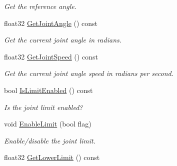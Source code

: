 \begin{DoxyCompactItemize}
\begin{DoxyCompactList}\small\item\em Get the reference angle. \end{DoxyCompactList}\item 
float32 \hyperlink{classb2_revolute_joint_ab20fc12ce5ad5d84a032eb613c80764a}{Get\+Joint\+Angle} () const \hypertarget{classb2_revolute_joint_ab20fc12ce5ad5d84a032eb613c80764a}{}\label{classb2_revolute_joint_ab20fc12ce5ad5d84a032eb613c80764a}

\begin{DoxyCompactList}\small\item\em Get the current joint angle in radians. \end{DoxyCompactList}\item 
float32 \hyperlink{classb2_revolute_joint_a48e4db13c187af159587d731656aa0c4}{Get\+Joint\+Speed} () const \hypertarget{classb2_revolute_joint_a48e4db13c187af159587d731656aa0c4}{}\label{classb2_revolute_joint_a48e4db13c187af159587d731656aa0c4}

\begin{DoxyCompactList}\small\item\em Get the current joint angle speed in radians per second. \end{DoxyCompactList}\item 
bool \hyperlink{classb2_revolute_joint_a7711afbfbdba4451d2dbfa8e55b9ded8}{Is\+Limit\+Enabled} () const \hypertarget{classb2_revolute_joint_a7711afbfbdba4451d2dbfa8e55b9ded8}{}\label{classb2_revolute_joint_a7711afbfbdba4451d2dbfa8e55b9ded8}

\begin{DoxyCompactList}\small\item\em Is the joint limit enabled? \end{DoxyCompactList}\item 
void \hyperlink{classb2_revolute_joint_a56bdfdd04e906e52d0258f6a481b9093}{Enable\+Limit} (bool flag)\hypertarget{classb2_revolute_joint_a56bdfdd04e906e52d0258f6a481b9093}{}\label{classb2_revolute_joint_a56bdfdd04e906e52d0258f6a481b9093}

\begin{DoxyCompactList}\small\item\em Enable/disable the joint limit. \end{DoxyCompactList}\item 
float32 \hyperlink{classb2_revolute_joint_a0f33656869e46ec9405f42d68e858220}{Get\+Lower\+Limit} () const \hypertarget{classb2_revolute_joint_a0f33656869e46ec9405f42d68e858220}{}\label{classb2_revolute_joint_a0f33656869e46ec9405f42d68e858220}


\end{DoxyCompactItemize}
